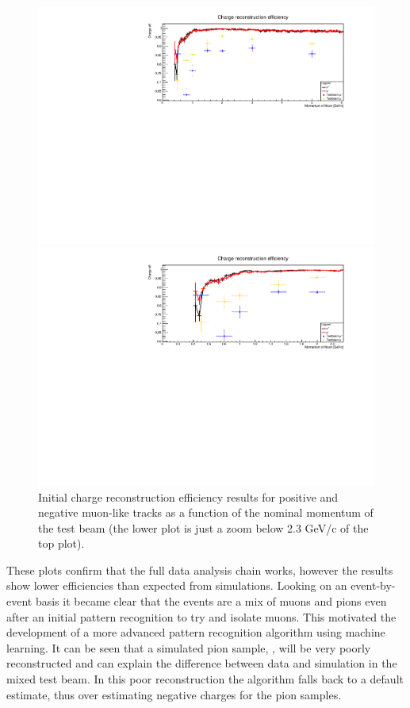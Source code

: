 \begin{figure}[h!]
\centering
\includegraphics[width=\textwidth]{figures/testbeam/TestBeam090318Plots/ChargeIDFull6GeV.pdf}

\includegraphics[width=\textwidth]{figures/testbeam/TestBeam090318Plots/ChargeIDFullLow.pdf}


\caption{Initial charge reconstruction efficiency results for positive and negative muon-like tracks as a function of the nominal momentum of the test beam (the lower plot is just a zoom below 2.3 GeV/c of the top plot).}
\label{fig:ChargeInitial}
\end{figure}

These plots confirm that the full data analysis chain works, however the results show lower efficiencies than expected from simulations. Looking on an event-by-event basis it became clear that the events are a mix of muons and pions even after an initial pattern recognition to try and isolate muons. This motivated the development of a more advanced pattern recognition algorithm using machine learning. It can be seen that a simulated pion sample, , will be very poorly reconstructed and can explain the difference between data and simulation in the mixed test beam. In this poor reconstruction the algorithm falls back to a default estimate, thus over estimating negative charges for the pion samples.


